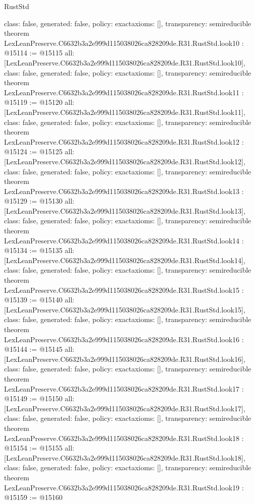 \begin{lexlean}{RustStd}
\begin{coremodule}
{  class: false,
  generated: false,
  policy: exact{axioms: []},
  transparency: semireducible
}
theorem LexLeanPreserve.C6632b3a2e999d115038026ca828209de.R31.RustStd.look10 : @15114 := @15115 {
  all: [LexLeanPreserve.C6632b3a2e999d115038026ca828209de.R31.RustStd.look10],
  class: false,
  generated: false,
  policy: exact{axioms: []},
  transparency: semireducible
}
theorem LexLeanPreserve.C6632b3a2e999d115038026ca828209de.R31.RustStd.look11 : @15119 := @15120 {
  all: [LexLeanPreserve.C6632b3a2e999d115038026ca828209de.R31.RustStd.look11],
  class: false,
  generated: false,
  policy: exact{axioms: []},
  transparency: semireducible
}
theorem LexLeanPreserve.C6632b3a2e999d115038026ca828209de.R31.RustStd.look12 : @15124 := @15125 {
  all: [LexLeanPreserve.C6632b3a2e999d115038026ca828209de.R31.RustStd.look12],
  class: false,
  generated: false,
  policy: exact{axioms: []},
  transparency: semireducible
}
theorem LexLeanPreserve.C6632b3a2e999d115038026ca828209de.R31.RustStd.look13 : @15129 := @15130 {
  all: [LexLeanPreserve.C6632b3a2e999d115038026ca828209de.R31.RustStd.look13],
  class: false,
  generated: false,
  policy: exact{axioms: []},
  transparency: semireducible
}
theorem LexLeanPreserve.C6632b3a2e999d115038026ca828209de.R31.RustStd.look14 : @15134 := @15135 {
  all: [LexLeanPreserve.C6632b3a2e999d115038026ca828209de.R31.RustStd.look14],
  class: false,
  generated: false,
  policy: exact{axioms: []},
  transparency: semireducible
}
theorem LexLeanPreserve.C6632b3a2e999d115038026ca828209de.R31.RustStd.look15 : @15139 := @15140 {
  all: [LexLeanPreserve.C6632b3a2e999d115038026ca828209de.R31.RustStd.look15],
  class: false,
  generated: false,
  policy: exact{axioms: []},
  transparency: semireducible
}
theorem LexLeanPreserve.C6632b3a2e999d115038026ca828209de.R31.RustStd.look16 : @15144 := @15145 {
  all: [LexLeanPreserve.C6632b3a2e999d115038026ca828209de.R31.RustStd.look16],
  class: false,
  generated: false,
  policy: exact{axioms: []},
  transparency: semireducible
}
theorem LexLeanPreserve.C6632b3a2e999d115038026ca828209de.R31.RustStd.look17 : @15149 := @15150 {
  all: [LexLeanPreserve.C6632b3a2e999d115038026ca828209de.R31.RustStd.look17],
  class: false,
  generated: false,
  policy: exact{axioms: []},
  transparency: semireducible
}
theorem LexLeanPreserve.C6632b3a2e999d115038026ca828209de.R31.RustStd.look18 : @15154 := @15155 {
  all: [LexLeanPreserve.C6632b3a2e999d115038026ca828209de.R31.RustStd.look18],
  class: false,
  generated: false,
  policy: exact{axioms: []},
  transparency: semireducible
}
theorem LexLeanPreserve.C6632b3a2e999d115038026ca828209de.R31.RustStd.look19 : @15159 := @15160 {
}
\end{coremodule}
\end{lexlean}
